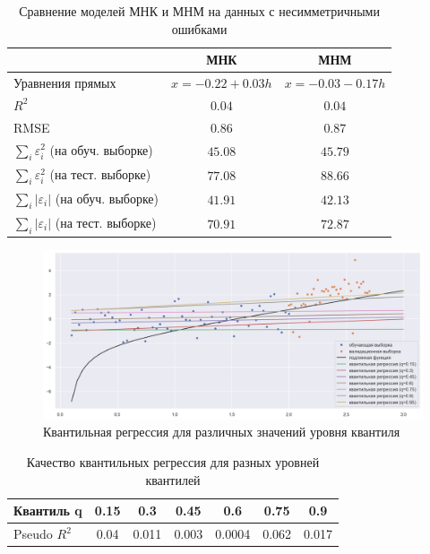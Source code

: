 \documentclass[a4paper,12pt]{article}
\begin{document}
\begin{table}[H]
    \centering
    \begin{tabular}{|l|c|c|}
        \hline
        & МНК & МНМ \\ \hline
        Уравнения прямых & $x = -0.22 + 0.03 h$ & $x = -0.03 - 0.17 h$ \\ \hline
        $R^2$ & $0.04$ & $0.04$ \\ \hline
        RMSE & $0.86$ & $0.87$ \\ \hline
        $\sum\limits_i \varepsilon_i^2$ (на обуч. выборке) & $45.08$ & $45.79$ \\ \hline
        $\sum\limits_i \varepsilon_i^2$ (на тест. выборке) & $77.08$ & $88.66$ \\ \hline
        $\sum\limits_i |\varepsilon_i|$ (на обуч. выборке) & $41.91$ & $42.13$ \\ \hline
        $\sum\limits_i |\varepsilon_i|$ (на тест. выборке) & $70.91$ & $72.87$ \\ \hline
    \end{tabular}
    \caption{Сравнение моделей МНК и МНМ на данных с несимметричными ошибками}
\end{table}

\begin{figure}[H]
    \centering
    \includegraphics[width=0.9\linewidth]{src/img/квантильная_регрессия.png}
    \caption{Квантильная регрессия для различных значений уровня квантиля}
\end{figure}

\begin{table}[H]
    \centering
    \begin{tabular}{|l|c|c|c|c|c|c|}
        \hline
        Квантиль q & 0.15 & 0.3 & 0.45 & 0.6 & 0.75 & 0.9 \\ \hline
        Pseudo $R^2$ & 0.04 & 0.011 & 0.003 & 0.0004 & 0.062 & 0.017 \\ \hline
    \end{tabular}
    \caption{Качество квантильных регрессия для разных уровней квантилей}
\end{table}
\end{document}
